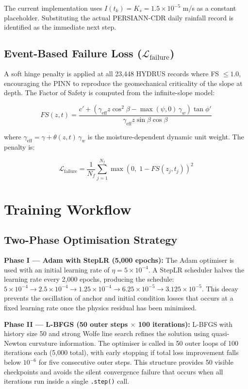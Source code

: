\documentclass[12pt]{report}
\begin{document}
The current implementation uses $I(t_k) = K_s = 1.5 \times 10^{-5}$
m/s as a constant placeholder. Substituting the actual PERSIANN-CDR
daily rainfall record is identified as the immediate next step.

\subsection{Event-Based Failure Loss ($\mathcal{L}_{\text{failure}}$)}
\label{sec:fs}

A soft hinge penalty is applied at all 23,448 HYDRUS records where
FS $\leq 1.0$, encouraging the PINN to reproduce the geomechanical
criticality of the slope at depth. The Factor of Safety is computed
from the infinite-slope model:

\begin{equation}
FS(z,t) =
\frac{c' + \left(\gamma_{\text{eff}} z \cos^2\!\beta -
      \max(\psi,0)\,\gamma_w\right)\tan\phi'}
{\gamma_{\text{eff}} z \sin\beta\cos\beta}
\end{equation}

where $\gamma_{\text{eff}} = \gamma + \theta(z,t)\,\gamma_w$ is the
moisture-dependent dynamic unit weight. The penalty is:

\begin{equation}
\mathcal{L}_{\text{failure}} = \frac{1}{N_f}
\sum_{j=1}^{N_f}
\max\!\left(0,\; 1 - FS(z_j, t_j)\right)^2
\end{equation}

\section{Training Workflow}

\subsection{Two-Phase Optimisation Strategy}

\textbf{Phase I — Adam with StepLR (5,000 epochs):}
The Adam optimiser is used with an initial learning rate of
$\eta = 5 \times 10^{-4}$. A StepLR scheduler halves the learning
rate every 2,000 epochs, producing the schedule:
$5\times10^{-4} \to 2.5\times10^{-4} \to 1.25\times10^{-4}
\to 6.25\times10^{-5} \to 3.125\times10^{-5}$.
This decay prevents the oscillation of anchor and initial condition
losses that occurs at a fixed learning rate once the physics residual
has been minimised.

\textbf{Phase II — L-BFGS (50 outer steps $\times$ 100 iterations):}
L-BFGS with history size 50 and strong Wolfe line search refines
the solution using quasi-Newton curvature information. The optimiser
is called in 50 outer loops of 100 iterations each (5,000 total),
with early stopping if total loss improvement falls below $10^{-6}$
for five consecutive outer steps. This structure provides 50 visible
checkpoints and avoids the silent convergence failure that occurs
when all iterations run inside a single \texttt{.step()} call.
\end{document}
